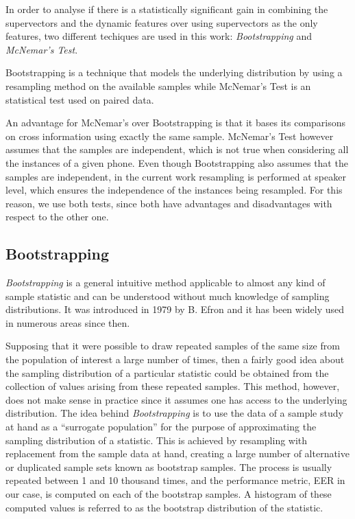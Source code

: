 In order to analyse if
there is a statistically significant gain in combining the
supervectors and the dynamic features
over using supervectors as the only features,
two different techiques are used in this work: \textit{Bootstrapping} and
\textit{McNemar's Test}.

Bootstrapping is a technique that models the underlying
distribution by using a resampling method on the available samples while McNemar's
Test is an statistical test used on paired data.

An advantage for McNemar's
over Bootstrapping is that it bases its comparisons on cross information using
exactly the same sample.
McNemar's Test however assumes that the samples
are independent, which is not true when considering
all the instances of a given phone. Even though Bootstrapping also assumes that
the samples are independent, in the current work resampling is performed
at speaker level, which ensures the independence of the instances being resampled.
For this reason, we use both tests, since both have advantages and
disadvantages with respect to the other one.

\subsection{Bootstrapping} \label{subsection:bootstrapping}

\textit{Bootstrapping} \cite{bootstrapping} is a general intuitive method applicable
to almost any kind of sample statistic and can be understood without much
knowledge of sampling distributions. It was introduced in 1979 by B. Efron and it has
been widely used in numerous areas since then.

Supposing that it were possible to draw repeated samples
of the same size from the population of interest a large number of times, then
a fairly good idea about the sampling distribution
of a particular statistic could be obtained from the collection of
values arising from these repeated samples.
This method, however, does not make sense in practice since it assumes one has access to the
underlying distribution.
The idea behind \textit{Bootstrapping} is to use the data of a sample study at hand as a
``surrogate population'' for the purpose of approximating the sampling distribution of
a statistic. This is achieved by resampling with replacement from the sample data
at hand, creating a large number of alternative or duplicated sample sets known as
bootstrap samples. The process is usually repeated between 1 and 10 thousand
times, and the performance metric, EER in our case,
is computed on each of the bootstrap
samples.
A histogram of these computed
values is referred to as the bootstrap distribution of the statistic.

